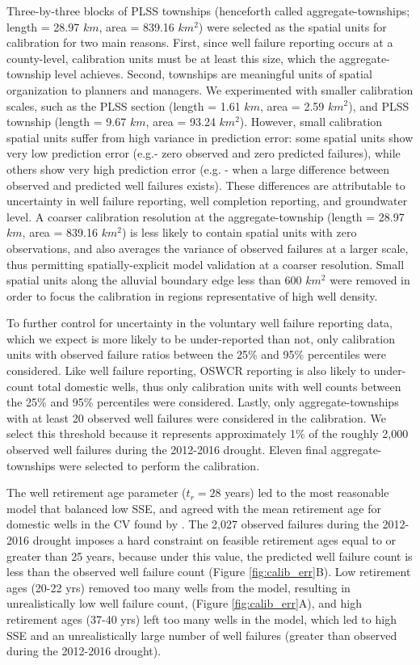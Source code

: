 Three-by-three blocks of PLSS townships (henceforth called aggregate-townships; length = 28.97 $km$, area = 839.16 $km^2$) were selected as the spatial units for calibration for two main reasons. First, since well failure reporting occurs at a county-level, calibration units must be at least this size, which the aggregate-township level achieves. Second, townships are meaningful units of spatial organization to planners and managers. We experimented with smaller calibration scales, such as the PLSS section (length = 1.61 $km$, area = 2.59 $km^2$), and PLSS township (length = 9.67 $km$, area = 93.24 $km^2$). However, small calibration spatial units suffer from high variance in prediction error: some spatial units show very low prediction error (e.g.- zero observed and zero predicted failures), while others show very high prediction error (e.g. - when a large difference between observed and predicted well failures exists). These differences are attributable to uncertainty in well failure reporting, well completion reporting, and groundwater level. A coarser calibration resolution at the aggregate-township (length = 28.97 $km$, area = 839.16 $km^2$) is less likely to contain spatial units with zero observations, and also averages the variance of observed failures at a larger scale, thus permitting spatially-explicit model validation at a coarser resolution. Small spatial units along the alluvial boundary edge less than 600 $km^2$ were removed in order to focus the calibration in regions representative of high well density. 

To further control for uncertainty in the voluntary well failure reporting data, which we expect is more likely to be under-reported than not, only calibration units with observed failure ratios between the 25\% and 95\% percentiles were considered. Like well failure reporting, OSWCR reporting is also likely to under-count total domestic wells, thus only calibration units with well counts between the 25\% and 95\% percentiles were considered. Lastly, only aggregate-townships with at least 20 observed well failures were considered in the calibration. We select this threshold because it represents approximately 1\% of the roughly 2,000 observed well failures during the 2012-2016 drought. Eleven final aggregate-townships were selected to perform the calibration.    


The well retirement age parameter ($t_r = 28$ years) led to the most reasonable model that balanced low SSE, and agreed with the mean retirement age for domestic wells in the CV found by \cite{Gailey2019}. The 2,027 observed failures during the 2012-2016 drought imposes a hard constraint on feasible retirement ages equal to or greater than 25 years, because under this value, the predicted well failure count is less than the observed well failure count (Figure \ref{fig:calib_err}B). Low retirement ages (20-22 yrs) removed too many wells from the model, resulting in unrealistically low well failure count, (Figure \ref{fig:calib_err}A), and high retirement ages (37-40 yrs) left too many wells in the model, which led to high SSE and an unrealistically large number of well failures (greater than observed during the 2012-2016 drought). 

